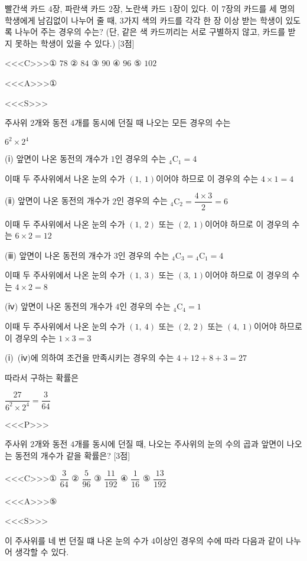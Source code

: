 \documentclass{oblivoir}
\begin{document}
빨간색 카드 $4$장, 파란색 카드 $2$장, 노란색 카드 $1$장이 있다. 이 $7$장의 카드를 세 명의 학생에게 남김없이 나누어 줄 때, $3$가지 색의 카드를 각각 한 장 이상 받는 학생이 있도록 나누어 주는 경우의 수는? (단, 같은 색 카드끼리는 서로 구별하지 않고, 카드를 받지 못하는 학생이 있을 수 있다.) [3점]

<<<C>>>① $78$ ② $84$ ③ $90$ ④ $96$ ⑤ $102$

<<<A>>>①

<<<S>>>

주사위 $2$개와 동전 $4$개를 동시에 던질 때 나오는 모든 경우의 수는

$6^{2}\times 2^{4}$

(ⅰ) 앞면이 나온 동전의 개수가 $1$인 경우의 수는 ${}_{4}\mathrm{C}_{1}=4$

이때 두 주사위에서 나온 눈의 수가 $(1,\:1)$이어야 하므로 이 경우의 수는 $4\times 1=4$

(ⅱ) 앞면이 나온 동전의 개수가 $2$인 경우의 수는 ${}_{4}\mathrm{C}_{2}=\dfrac{4\times 3}{2}=6$

이때 두 주사위에서 나온 눈의 수가 $(1,\:2)$ 또는 $(2,\:1)$이어야 하므로 이 경우의 수는 $6\times 2=12$

(ⅲ) 앞면이 나온 동전의 개수가 $3$인 경우의 수는 ${}_{4}\mathrm{C}_{3}={}_{4}\mathrm{C}_{1}=4$

이때 두 주사위에서 나온 눈의 수가 $(1,\:3)$ 또는 $(3,\:1)$이어야 하므로 이 경우의 수는 $4\times 2=8$

(ⅳ) 앞면이 나온 동전의 개수가 $4$인 경우의 수는 ${}_{4}\mathrm{C}_{4}=1$

이때 두 주사위에서 나온 눈의 수가 $(1,\:4)$ 또는 $(2,\:2)$ 또는 $(4,\:1)$이어야 하므로 이 경우의 수는 $1\times 3=3$

(ⅰ)~(ⅳ)에 의하여 조건을 만족시키는 경우의 수는 $4+12+8+3=27$

따라서 구하는 확률은

$\dfrac{27}{6^{2}\times 2^{4}}=\dfrac{3}{64}$

<<<P>>>

주사위 $2$개와 동전 $4$개를 동시에 던질 때, 나오는 주사위의 눈의 수의 곱과 앞면이 나오는 동전의 개수가 같을 확률은? [3점]

<<<C>>>① $\dfrac{3}{64}$ ② $\dfrac{5}{96}$ ③ $\dfrac{11}{192}$ ④ $\dfrac{1}{16}$ ⑤ $\dfrac{13}{192}$

<<<A>>>⑤

<<<S>>>

이 주사위를 네 번 던질 떄 나온 눈의 수가 $4$이상인 경우의 수에 따라 다음과 같이 나누어 생각할 수 있다.
\end{document}
